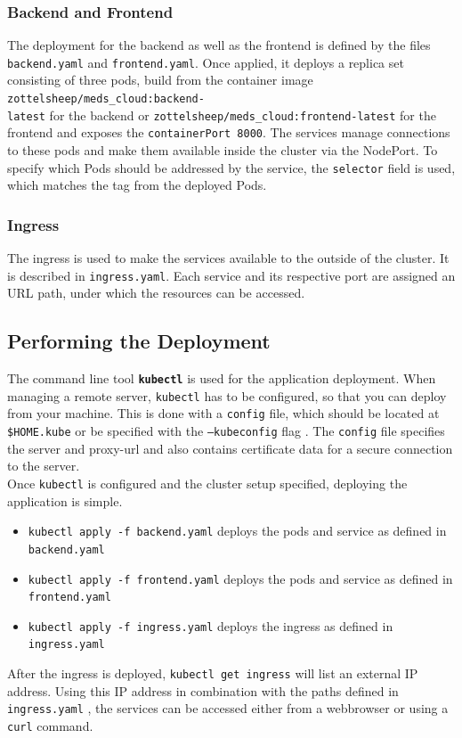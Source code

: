         \subsubsection{Backend and Frontend}
            The deployment for the backend as well as the frontend is defined by the files \texttt{backend.yaml} and \texttt{frontend.yaml}.
            Once applied, it deploys a replica set consisting of three pods, build from the container image \texttt{zottelsheep/meds\_cloud:backend-\\latest} for the backend
            or \texttt{zottelsheep/meds\_cloud:frontend-latest} for the frontend and exposes the \texttt{containerPort 8000}.
            The services manage connections to these pods and make them available inside the cluster via the NodePort. 
            To specify which Pods should be addressed by the service, the \texttt{selector} field is used, which matches the tag from the deployed Pods.

        \subsubsection{Ingress}
            The ingress is used to make the services available to the outside of the cluster.
            It is described in \texttt{ingress.yaml}.
            Each service and its respective port are assigned an URL path, under which the resources can be accessed. 
        
    \subsection{Performing the Deployment}
        The command line tool \textbf{\texttt{kubectl}} is used for the application deployment.
        When managing a remote server, \texttt{kubectl} has to be configured, so that you can deploy from your machine.
        This is done with a \texttt{config} file, which should be located at \texttt{\$HOME\/.kube} or be specified with the \texttt{--kubeconfig} flag \cite{Kubernetes_kubeconfig:2022}.
        The \texttt{config} file specifies the server and proxy-url and also contains certificate data for a secure connection to the server.
        \medskip\\
        Once \texttt{kubectl} is configured and the cluster setup specified, deploying the application is simple.
        \begin{itemize}
            \item \texttt{kubectl apply -f backend.yaml} deploys the pods and service as defined in \texttt{backend.yaml}
            \item \texttt{kubectl apply -f frontend.yaml} deploys the pods and service as defined in \texttt{frontend.yaml}
            \item \texttt{kubectl apply -f ingress.yaml} deploys the ingress as defined in \texttt{ingress.yaml}
        \end{itemize}
        After the ingress is deployed, \texttt{kubectl get ingress} will list an external IP address.
        Using this IP address in combination with the paths defined in \texttt{ingress.yaml} , the services can be accessed either from a webbrowser or using a \texttt{curl} command.
    
